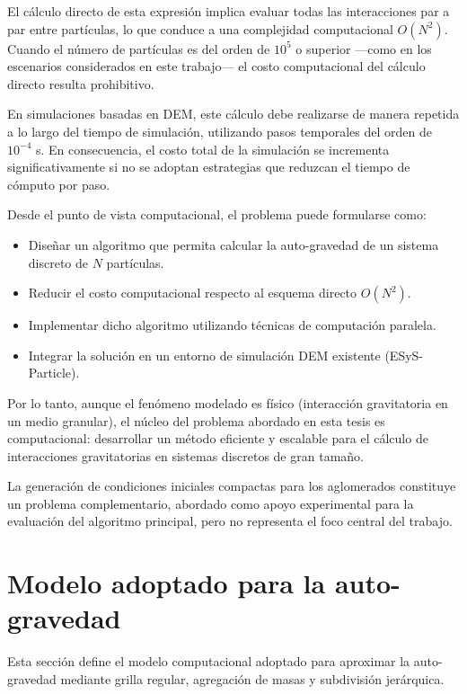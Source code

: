 \documentclass[a4paper,11pt]{book}
\begin{document}
El cálculo directo de esta expresión implica evaluar todas las interacciones par a par entre partículas, lo que conduce a una complejidad computacional $O(N^2)$. Cuando el número de partículas es del orden de $10^5$ o superior —como en los escenarios considerados en este trabajo— el costo computacional del cálculo directo resulta prohibitivo.

En simulaciones basadas en DEM, este cálculo debe realizarse de manera repetida a lo largo del tiempo de simulación, utilizando pasos temporales del orden de $10^{-4}$ s. En consecuencia, el costo total de la simulación se incrementa significativamente si no se adoptan estrategias que reduzcan el tiempo de cómputo por paso.

Desde el punto de vista computacional, el problema puede formularse como:

\begin{itemize}
	\item Diseñar un algoritmo que permita calcular la auto-gravedad de un sistema discreto de $N$ partículas.
	\item Reducir el costo computacional respecto al esquema directo $O(N^2)$.
	\item Implementar dicho algoritmo utilizando técnicas de computación paralela.
	\item Integrar la solución en un entorno de simulación DEM existente (ESyS-Particle).
\end{itemize}

Por lo tanto, aunque el fenómeno modelado es físico (interacción gravitatoria en un medio granular), el núcleo del problema abordado en esta tesis es computacional: desarrollar un método eficiente y escalable para el cálculo de interacciones gravitatorias en sistemas discretos de gran tamaño.

La generación de condiciones iniciales compactas para los aglomerados constituye un problema complementario, abordado como apoyo experimental para la evaluación del algoritmo principal, pero no representa el foco central del trabajo.

\section{Modelo adoptado para la auto-gravedad}
\label{sec:modelo_autogravedad}

Esta sección define el modelo computacional adoptado para aproximar la auto-gravedad mediante grilla regular, agregación de masas y subdivisión jerárquica.
\end{document}
